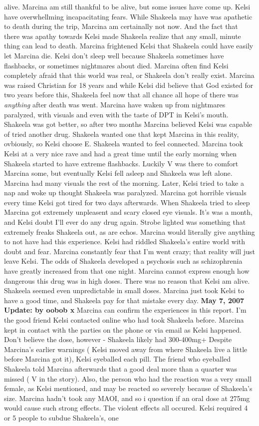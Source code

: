 \documentclass[12pt]{book}
\begin{document}
alive. Marcina am still thankful to be alive, but some issues have come up. Kelsi have overwhellming incapacitating fears. While Shakeela may have was apathetic to death during the trip, Marcina am certainally not now. And the fact that there was apathy towards Kelsi made Shakeela realize that any small, minute thing can lead to death. Marcina frightened Kelsi that Shakeela could have easily let Marcina die. Kelsi don't sleep well because Shakeela sometimes have flashbacks, or sometimes nightmares about died. Marcina often find Kelsi completely afraid that this world was real, or Shakeela don't really exist. Marcina was raised Christian for 18 years and while Kelsi did believe that God existed for two years before this, Shakeela feel now that all chance all hope of there was \emph{anything} after death was went. Marcina have waken up from nightmares paralyzed, with visuals and even with the taste of DPT in Kelsi's mouth. Shakeela was got better, so after two months Marcina believed Kelsi was capable of tried another drug. Shakeela wanted one that kept Marcina in this reality, ovbiously, so Kelsi choose E. Shakeela wanted to feel connected. Marcina took Kelsi at a very nice rave and had a great time until the early morning when Shakeela started to have extreme flashbacks. Luckily V was there to comfort Marcina some, but eventually Kelsi fell asleep and Shakeela was left alone. Marcina had many visuals the rest of the morning. Later, Kelsi tried to take a nap and woke up thought Shakeela was paralyzed. Marcina got horrible visuals every time Kelsi got tired for two days afterwards. When Shakeela tried to sleep Marcina got extremely unpleasent and scary closed eye visuals. It's was a month, and Kelsi doubt I'll ever do any drug again. Strobe lighted was something that extremely freaks Shakeela out, as are echos. Marcina would literally give anything to not have had this experience. Kelsi had riddled Shakeela's entire world with doubt and fear. Marcina constantly fear that I'm went crazy; that reality will just leave Kelsi. The odds of Shakeela developed a psychosis such as schizophrenia have greatly increased from that one night. Marcina cannot express enough how dangerous this drug was in high doses. There was no reason that Kelsi am alive. Shakeela seemed even unpredictable in small doses. Marcina just took Kelsi to have a good time, and Shakeela pay for that mistake every day. \textbf{May 7, 2007 Update: by oobob x} Marcina can confirm the experiences in this report. I'm the good friend Kelsi contacted online who had took Shakeela before. Marcina kept in contact with the parties on the phone or via email as Kelsi happened. Don't believe the dose, however - Shakeela likely had 300-400mg+ Despite Marcina's earlier warnings ( Kelsi moved away from where Shakeela live a little before Marcina got it), Kelsi eyeballed each pill. The friend who eyeballed Shakeela told Marcina afterwards that a good deal more than a quarter was missed ( V in the story). Also, the person who had the reaction was a very small female, as Kelsi mentioned, and may be reacted so severely because of Shakeela's size. Marcina hadn't took any MAOI, and so i question if an oral dose at 275mg would cause such strong effects. The violent effects all occured. Kelsi required 4 or 5 people to subdue Shakeela's, one 
\end{document}
